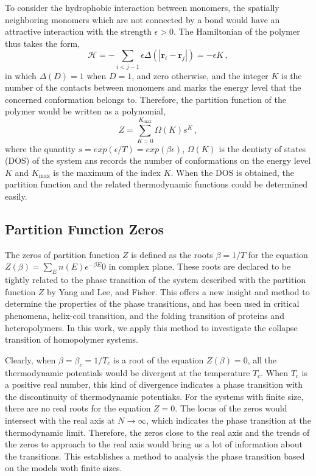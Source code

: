 \documentclass[preprint,preprintnumbers,amsmath,amssymb,showpacs,pre]{revtex4-1}
\begin{document}
To consider the hydrophobic interaction between monomers, the spatially
neighboring monomers which are not connected by a bond would have an attractive
interaction with the strength $\epsilon>0$. The Hamiltonian of the polymer thus
takes the form,
\begin{equation}
{\mathcal H}=-\sum_{i<j-1}\epsilon \Delta(|{\mathbf r}_i-{\mathbf r}_j|)=
-\epsilon K \, ,
\end{equation}
in which $\Delta(D)=1$ when $D=1$, and zero otherwise, and the integer $K$
is the number of the contacts between monomers and marks the energy level
that the concerned conformation belongs to. Therefore, the partition
function of the polymer would be written as a polynomial,
\begin{equation}
Z=\sum_{K=0}^{K_{\text{max}}} \Omega(K) s^K \, ,
\end{equation}
where the quantity $s=exp(\epsilon/T)=exp(\beta\epsilon)$, $\Omega(K)$ is the dentisty
of states (DOS) of the system ans records the number 
of conformations on the energy level $K$ and $K_{\text{max}}$ is the
maximum of the index $K$. When the DOS is obtained, the partition function and
the related thermodynamic functions could be determined easily.

\subsection{Partition Function Zeros}

The zeros of partition function $Z$ is defined as the roots $\beta=1/T$
for the equation $Z(\beta)=\sum_E n(E)e^{-\beta E}0$ in complex plane. These
roots are declared to be
tightly related to the phase transition of the system described with the
partition function $Z$ by Yang and Lee, and Fisher. This offers a new insight
and method to determine the properties of the phase transitions, and has been
used in critical phenomena, helix-coil transition, and the folding transition of
proteins and heteropolymers. In this work, we apply this method to investigate
the collapse transition of homopolymer systems.

Clearly, when $\beta=\beta_c=1/T_c$ is a root of the equation $Z(\beta)=0$, all
the thermodynamic potentials would be divergent at the temperature $T_c$. When
$T_c$ is a positive real number, this kind of divergence indicates a phase
transition with the discontinuity of thermodynamic potentiaks. For the systems
with finite size, there are no real roots for the equation $Z=0$. The locus of
the zeros would intersect with the real axis at $N\rightarrow\infty$, which
indicates the phase transition at the thermodynamic limit. Therefore, the zeros
close to the real axis and the trends of the zeros to approach to the real axis
would bring us a lot of information about the transitions. This establishes a
method to analysis the phase transition based on the models woth finite sizes.
\end{document}
